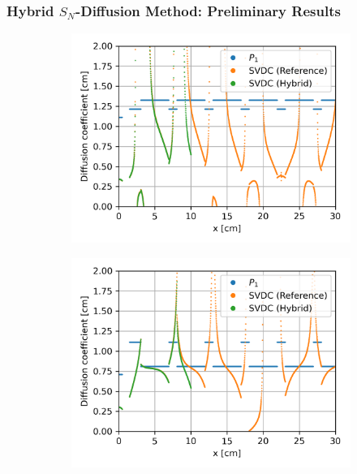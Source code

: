 \begin{frame}
  \frametitle{Hybrid $S_N$-Diffusion Method: Preliminary Results}
  \begin{figure}
    \centering
    \begin{subfigure}[t]{.35\textwidth}
      \centering
      \includegraphics[width=\textwidth]{../images/case-5a-group-1-diffcoef}
      \label{fig:c5ag1dc}
    \end{subfigure}
    \begin{subfigure}[t]{.35\textwidth}
      \centering
      \includegraphics[width=\textwidth]{../images/case-5a-group-2-diffcoef}
      \label{fig:c5ag2dc}
    \end{subfigure}
    \begin{subfigure}[t]{.35\textwidth}

\end{subfigure}
\end{figure}
\end{frame}
